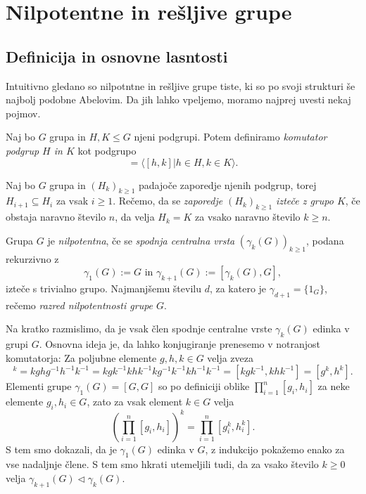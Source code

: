 \section{Nilpotentne in rešljive grupe}

\subsection{Definicija in osnovne lasntosti}

Intuitivno gledano so nilpotntne in rešljive grupe tiste, ki so po svoji strukturi še najbolj podobne Abelovim. Da jih lahko vpeljemo, moramo najprej uvesti nekaj pojmov.
\begin{definicija}\label{def_komutator_grup}
    Naj bo $G$ grupa in $H, K \le G$ njeni podgrupi. Potem definiramo \emph{komutator podgrup $H$ in $K$} kot podgrupo \begin{equation*}
        [H, K]  = \langle [h, k] | h \in H, k \in K \rangle.
    \end{equation*}
\end{definicija}

\begin{definicija}
\label{def_iztek_zaporedja}
Naj bo $G$ grupa in $(H_k)_{k \ge 1}$ padajoče zaporedje njenih podgrup, torej $H_{i + 1} \subseteq H_{i}$ za vsak $i \ge 1$. 
Rečemo, da se \emph{zaporedje $(H_k)_{k \ge 1}$ izteče z grupo $K$}, če obstaja naravno število $n$, da velja $H_k = K$ za vsako naravno število $k \ge n$.
\end{definicija}

\begin{definicija}
\label{def_nilpotentna_grupa}
Grupa $G$ je \emph{nilpotentna}, če se \emph{spodnja centralna vrsta} $(\gamma_k(G))_{k \ge 1}$, podana rekurzivno z \begin{equation*}
\gamma_1(G) := G \text{ in } \gamma_{k +1}(G) := [\gamma_k(G), G],
\end{equation*}  
izteče s trivialno grupo. Najmanjšemu številu $d$, za katero je $\gamma_{d + 1} = \{ 1_G \}$, rečemo \emph{razred nilpotentnosti grupe $G$}.    
\end{definicija}

Na kratko razmislimo, da je vsak člen spodnje centralne vrste $\gamma_k(G)$ edinka v grupi $G$. Osnovna ideja je, da lahko konjugiranje prenesemo v notranjost komutatorja: Za poljubne elemente $g, h, k \in G$ velja zveza \begin{equation*}
    [g, h]^k = kghg^{-1}h^{-1}k^{-1} = kgk^{-1}khk^{-1}kg^{-1}k^{-1}kh^{-1}k^{-1} = [kgk^{-1}, khk^{-1}] = [g^k , h^k].
\end{equation*}
Elementi grupe $\gamma_1(G)  = [G , G]$ so po definiciji oblike $\prod_{i = 1}^n [g_i, h_i]$ za neke elemente $g_i, h_i \in G$, zato za vsak element $k \in G$ velja \begin{equation*}
    \left( \prod_{i = 1}^n [g_i, h_i]\right)^k = \prod_{i = 1}^n [g_i^k, h_i^k]. 
\end{equation*}
S tem smo dokazali, da je $\gamma_1(G)$ edinka v $G$, z indukcijo pokažemo enako za vse nadaljnje člene. S tem smo hkrati utemeljili tudi, da za vsako število $k \ge 0$ velja $\gamma_{k+1}(G) \triangleleft \gamma_k(G)$.

